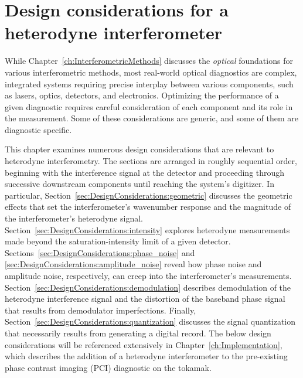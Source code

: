 \chapter{Design considerations for a heterodyne interferometer}
\label{ch:DesignConsiderations}
While Chapter~\ref{ch:InterferometricMethods} discusses the
\emph{optical} foundations for various interferometric methods,
most real-world optical diagnostics are complex, integrated systems
requiring precise interplay between various components, such as
lasers, optics, detectors, and electronics.
Optimizing the performance of a given diagnostic
requires careful consideration
of each component and its role in the measurement.
Some of these considerations are generic, and
some of them are diagnostic specific.

This chapter examines numerous design considerations
that are relevant to heterodyne interferometry.
The sections are arranged in roughly sequential order,
beginning with the interference signal at the detector and
proceeding through successive downstream components
until reaching the system's digitizer.
In particular, Section~\ref{sec:DesignConsiderations:geometric}
discusses the geometric effects that
set the interferometer's wavenumber response and
the magnitude of the interferometer's heterodyne signal.
Section~\ref{sec:DesignConsiderations:intensity}
explores heterodyne measurements made
beyond the saturation-intensity limit of a given detector.
Sections~\ref{sec:DesignConsiderations:phase_noise} and
\ref{sec:DesignConsiderations:amplitude_noise}
reveal how phase noise and amplitude noise, respectively,
can creep into the interferometer's measurements.
Section~\ref{sec:DesignConsiderations:demodulation}
describes demodulation of the heterodyne interference signal and
the distortion of the baseband phase signal
that results from demodulator imperfections.
Finally, Section~\ref{sec:DesignConsiderations:quantization}
discusses the signal quantization
that necessarily results
from generating a digital record.
The below design considerations will be referenced extensively in
Chapter~\ref{ch:Implementation}, which
describes the addition of a heterodyne interferometer
to the pre-existing phase contrast imaging (PCI) diagnostic
on the \diiid\space tokamak.


